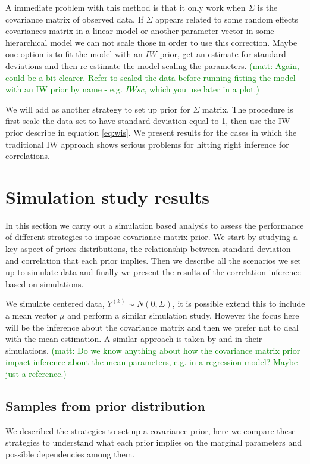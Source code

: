 \documentclass[a4paper]{article}
\newcommand{\matt}[1]{\textcolor{green}{(matt: #1)}}
\begin{document}
A immediate problem with this method is that it only work when $\Sigma$ is the covariance matrix of observed data. If $\Sigma$ appears related to some random effects covariances matrix in a linear model or another parameter vector in some hierarchical model we can not scale those in order to use this correction.  Maybe one option is to fit the model with an $IW$ prior, get an estimate for standard deviations and then re-estimate the model scaling the parameters. \matt{Again, could be a bit clearer. Refer to scaled the data before running fitting the model with an IW prior by name - e.g. $IWsc$, which you use later in a plot.}

We will add as another strategy to set up prior for $\Sigma$ matrix. The procedure is first scale the data set to have standard deviation equal to 1, then use the IW prior describe in equation \ref{eq:wis}. We present results for the cases in which the traditional IW approach shows serious problems for hitting right inference for correlations. 

\section{Simulation study results \label{sec:results}}

In this section we carry out a simulation based analysis to assess the performance of different strategies to impose covariance matrix prior. We start by studying a key aspect of priors distributions, the relationship between standard deviation and correlation that each prior implies. Then we describe all the scenarios we set up to simulate data and finally we present the results of the correlation inference based on simulations.  

We simulate centered data, $Y^{(k)}\sim N(0,\Sigma)$, it is possible extend this to include a mean vector $\mu$ and perform a similar simulation study. However the focus here will be the inference about the covariance matrix and then we prefer not to deal with the mean estimation. A similar approach is taken by  \cite{daniels1999} and \cite{matilde} in their simulations. \matt{Do we know anything about how the covariance matrix prior impact inference about the mean parameters, e.g. in a regression model? Maybe just a reference.}

\subsection{Samples from  prior distribution} 
We described the strategies to set up a covariance prior, here we compare these strategies to understand what each prior implies on the marginal parameters and possible dependencies among them. 
\end{document}
